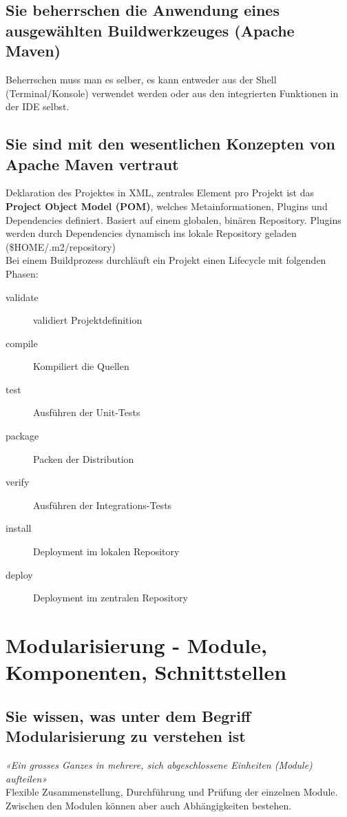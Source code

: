 \documentclass[a4paper]{article}
\begin{document}
		\subsection{Sie beherrschen die Anwendung eines ausgewählten Buildwerkzeuges (Apache Maven)}
		Beherrschen muss man es selber, es kann entweder aus der Shell (Terminal/Konsole) verwendet werden oder aus den integrierten Funktionen in der IDE selbst.
		
		\subsection{Sie sind mit den wesentlichen Konzepten von Apache Maven vertraut}
		Deklaration des Projektes in XML, zentrales Element pro Projekt ist das \textbf{Project Object Model (POM)}, welches Metainformationen, Plugins und Dependencies definiert. 
		Basiert auf einem globalen, binären Repository. Plugins werden durch Dependencies dynamisch ins lokale Repository geladen (\$HOME/.m2/repository)\\
		Bei einem Buildprozess durchläuft ein Projekt einen Lifecycle mit folgenden Phasen:\\
		\begin{description}
			\item[validate] validiert Projektdefinition
			\item[compile] Kompiliert die Quellen
			\item[test] Ausführen der Unit-Tests
			\item[package] Packen der Distribution
			\item[verify] Ausführen der Integrations-Tests
			\item[install] Deployment im lokalen Repository
			\item[deploy] Deployment im zentralen Repository
		\end{description}

	\newpage
	\section{Modularisierung - Module, Komponenten, Schnittstellen}
	
	\subsection{Sie wissen, was unter dem Begriff Modularisierung zu verstehen ist}
	\textit{«Ein grosses Ganzes in mehrere, sich abgeschlossene Einheiten (Module) aufteilen»} \\
	Flexible Zusammenstellung, Durchführung und Prüfung der einzelnen Module. 
	Zwischen den Modulen können aber auch Abhängigkeiten bestehen.
	
\end{document}
